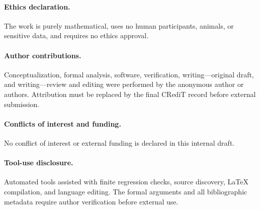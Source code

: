 \paragraph{Ethics declaration.}
The work is purely mathematical, uses no human participants, animals, or
sensitive data, and requires no ethics approval.

\paragraph{Author contributions.}
Conceptualization, formal analysis, software, verification, writing---original
draft, and writing---review and editing were performed by the anonymous
author or authors.  Attribution must be replaced by the final CRediT record
before external submission.

\paragraph{Conflicts of interest and funding.}
No conflict of interest or external funding is declared in this internal
draft.

\paragraph{Tool-use disclosure.}
Automated tools assisted with finite regression checks, source discovery,
LaTeX compilation, and language editing.  The formal arguments and all
bibliographic metadata require author verification before external use.
